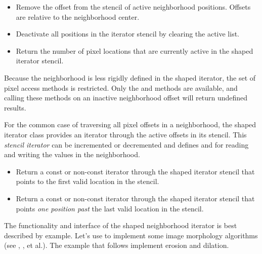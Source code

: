 {\begin{itemize}
\item \textbf{} Remove the offset
 from the stencil of active neighborhood positions.  Offsets are
relative to the neighborhood center. 

\item \textbf{} Deactivate all positions in the
iterator stencil by clearing the active list.

\item \textbf{} Return the number
of pixel locations that are currently active in the shaped iterator stencil.

\end{itemize}

Because the neighborhood is less rigidly defined in the shaped iterator, the
set of pixel access methods is restricted.  Only the  and
 methods are available, and calling these methods on an inactive
neighborhood offset will return undefined results.

For the common case of traversing all pixel offsets in a neighborhood, the
shaped iterator class provides an iterator through the active offsets in its
stencil.   This \emph{stencil iterator} can be incremented or decremented and
defines  and  for reading and writing the values in the
neighborhood.

\begin{itemize}
\item \textbf{} Return a
const or non-const iterator through the shaped iterator stencil that points to
the first valid location in the stencil.

\item \textbf{} Return a
const or non-const iterator through the shaped iterator stencil that points
\emph{one position past} the last valid location in the stencil.
\end{itemize}

The functionality and interface of the shaped neighborhood iterator is best
described by example.  Let's use  to
implement some image morphology algorithms (see \cite{Gonzales1993},
\cite{Castleman1996}, et al.).  The example that follows implement erosion and
dilation.

}
